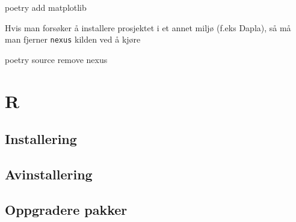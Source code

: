 \documentclass[
  letterpaper,
  DIV=11,
  numbers=noendperiod]{scrreprt}
\newenvironment{Shaded}{\begin{snugshade}}{\end{snugshade}}
\newcommand{\NormalTok}[1]{\textcolor[rgb]{0.00,0.23,0.31}{#1}}
\begin{document}
\begin{Shaded}
\begin{Highlighting}[]
\NormalTok{poetry add matplotlib}
\end{Highlighting}
\end{Shaded}

\begin{tcolorbox}[enhanced jigsaw, colback=white, rightrule=.15mm, opacityback=0, bottomrule=.15mm, leftrule=.75mm, arc=.35mm, toprule=.15mm, colframe=quarto-callout-warning-color-frame, left=2mm, breakable]
\begin{minipage}[t]{5.5mm}
\textcolor{quarto-callout-warning-color}{\faExclamationTriangle}
\end{minipage}%
\begin{minipage}[t]{\textwidth - 5.5mm}

Hvis man forsøker å installere prosjektet i et annet miljø (f.eks
Dapla), så må man fjerner \texttt{nexus} kilden ved å kjøre

\begin{Shaded}
\begin{Highlighting}[]
\NormalTok{poetry source remove nexus}
\end{Highlighting}
\end{Shaded}

\end{minipage}%
\end{tcolorbox}

\hypertarget{r-2}{%
\section{R}\label{r-2}}

\hypertarget{installering-2}{%
\subsection{Installering}\label{installering-2}}

\hypertarget{avinstallering-2}{%
\subsection{Avinstallering}\label{avinstallering-2}}

\hypertarget{oppgradere-pakker-2}{%
\subsection{Oppgradere pakker}\label{oppgradere-pakker-2}}
\end{document}
